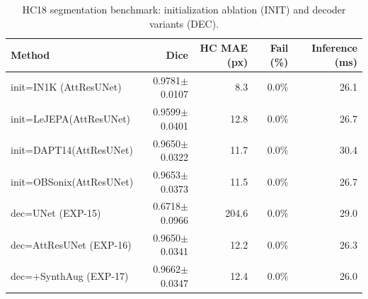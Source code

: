 \begin{table}[t]
\centering
\caption{HC18 segmentation benchmark: initialization ablation (INIT) and decoder variants (DEC).}
\label{tab:bench}
\begin{tabular}{lrrrr}
\toprule
Method & Dice & HC MAE (px) & Fail (\%) & Inference (ms) \\
\midrule
[INIT] init=IN1K  (AttResUNet) & 0.9781$\pm$0.0107 & 8.3 & 0.0\% & 26.1 \\
[INIT] init=LeJEPA(AttResUNet) & 0.9599$\pm$0.0401 & 12.8 & 0.0\% & 26.7 \\
[INIT] init=DAPT14(AttResUNet) & 0.9650$\pm$0.0322 & 11.7 & 0.0\% & 30.4 \\
[INIT] init=OBSonix(AttResUNet) & 0.9653$\pm$0.0373 & 11.5 & 0.0\% & 26.7 \\
[DEC]  dec=UNet         (EXP-15) & 0.6718$\pm$0.0966 & 204.6 & 0.0\% & 29.0 \\
[DEC]  dec=AttResUNet   (EXP-16) & 0.9650$\pm$0.0341 & 12.2 & 0.0\% & 26.3 \\
[DEC]  dec=+SynthAug    (EXP-17) & 0.9662$\pm$0.0347 & 12.4 & 0.0\% & 26.0 \\
\bottomrule
\end{tabular}
\end{table}